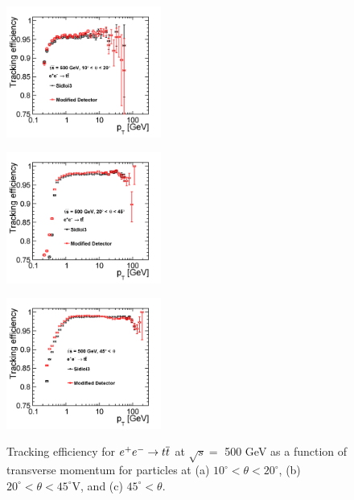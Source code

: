 \begin{figure}[h!]
\begin{minipage}{.33\textwidth}
\centering
\includegraphics[width=2.0in]{eettbarEfficiencyPtLowTheta_sidloi3_det_vtxbar_3doublet.png}
\label{fig:eettbareffptlowtheta}
\end{minipage}%
\begin{minipage}{.33\textwidth}
\centering
\includegraphics[width=2.0in]{eettbarEfficiencyPtMedTheta_sidloi3_det_vtxbar_3doublet.png}
\label{fig:eettbareffptmedtheta}
\end{minipage}
\begin{minipage}{.33\textwidth}
\centering
\includegraphics[width=2.0in]{eettbarEfficiencyPtHighTheta_sidloi3_det_vtxbar_3doublet.png}
\label{fig:eettbareffpthightheta}
\end{minipage}
\caption{Tracking efficiency for $\ee \rightarrow \ttbar$ at $ \sqrt{s} = $ 500 GeV as a function of transverse momentum
for particles at (a) $10^{\circ}< \theta < 20^{\circ}$, (b) $20^{\circ}< \theta < 45^{\circ}$V, and (c) $45^{\circ}< \theta$.}
\label{fig:eettbareffpt}
\end{figure}

